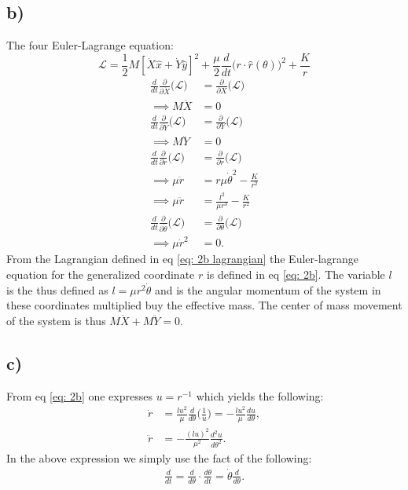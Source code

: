 \documentclass{article}
\begin{document}
\subsection*{b)}
The four Euler-Lagrange equation:
\begin{equation}\label{eq: 2b lagrangian}
    \mathcal{L} = \frac{1}{2}M\left[\dot{X}\hat{x} + \dot{Y}\hat{y}\right]^2 + \frac{\mu}{2}\frac{d}{dt}\Big(r\cdot\hat{r}(\theta)\Big)^2+\frac{K}{r} 
\end{equation}
\begin{align}
    \frac{d}{dt}\frac{\partial}{\partial \dot{X}}\Big(\mathcal{L}\Big) &=\frac{\partial }{\partial X}\Big(\mathcal{L}\Big)\nonumber\\
    \implies M\ddot{X}&=0\nonumber\\
    \frac{d}{dt}\frac{\partial}{\partial \dot{Y}}\Big(\mathcal{L}\Big)&=\frac{\partial }{\partial Y}\Big(\mathcal{L}\Big)\nonumber\\
    \implies M\ddot{Y}&=0\nonumber\\
    \frac{d}{dt}\frac{\partial}{\partial \dot{r}}\Big(\mathcal{L}\Big) &=\frac{\partial }{\partial r}\Big(\mathcal{L}\Big)\nonumber\\
    \implies\mu\ddot{r}&=r\mu\dot{\theta}^2 - \frac{K}{r^2}\nonumber\\
    \implies\mu\ddot{r}&=\frac{l^2}{\mu r^3} - \frac{K}{r^2}\label{eq: 2b}\\
    \frac{d}{dt}\frac{\partial}{\partial \dot{\theta}}\Big(\mathcal{L}\Big) &=\frac{\partial }{\partial \theta}\Big(\mathcal{L}\Big)\nonumber\\
    \implies \mu \dot{r}^2 &= 0.\nonumber
\end{align}From the Lagrangian defined in eq \eqref{eq: 2b lagrangian} the Euler-lagrange equation for the generalized coordinate $r$ is defined in eq \eqref{eq: 2b}.
The variable $l$ is the thus defined as $l = \mu r^2\dot{\theta}$ and is the angular momentum of the system in these coordinates multiplied buy the effective mass. The center of mass movement of the system is thus $M\ddot{X} + M\ddot{Y} = 0$.

\subsection*{c)}
From eq \eqref{eq: 2b} one expresses $ u = r^{-1}$ which yields the following:
\begin{align*}
    \dot{r} &= \frac{l u^2}{\mu}\frac{d}{d\theta}\Big(\frac{1}{u}\Big) = -\frac{l u^2}{\mu}\frac{du}{d\theta},\\
    \ddot{r} &= -\frac{(l u )^2}{\mu^2}\frac{d^2u}{d\theta^2}.
\end{align*}In the above expression we simply use the fact of the following:
\begin{align*}
    \frac{d}{dt} = \frac{d}{d\theta}\cdot\frac{d\theta}{dt} = \dot{\theta}\frac{d}{d\theta}.
\end{align*}
\end{document}
